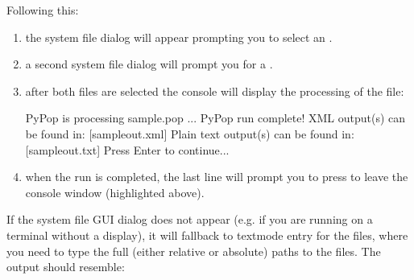 \documentclass[letterpaper,10pt,english,openany,oneside]{sphinxmanual}
\begin{document}
\sphinxAtStartPar
Following this:
\begin{enumerate}
%
\item {} 
\sphinxAtStartPar
the system file dialog will appear prompting you to select an
 {\hyperref[\detokenize{docs/guide-chapter-usage:guide-usage-configfile}]{}}.

\item {} 
\sphinxAtStartPar
a second system file dialog will prompt you for a 
{\hyperref[\detokenize{docs/guide-chapter-usage:guide-usage-datafile}]{}}.

\item {} 
\sphinxAtStartPar
after both files are selected the console will display the
processing of the file:

%
\begin{sphinxVerbatim}[commandchars=\\\{\}]
PyPop is processing sample.pop ...
PyPop run complete!
XML output(s) can be found in: [\PYGZsq{}sample\PYGZhy{}out.xml\PYGZsq{}]
Plain text output(s) can be found in: [\PYGZsq{}sample\PYGZhy{}out.txt\PYGZsq{}]
Press Enter to continue...
\end{sphinxVerbatim}
\sphinxresetverbatimhllines

\item {} 
\sphinxAtStartPar
when the run is completed, the last line will prompt you to press
 to leave the console window (highlighted above).

\end{enumerate}

\sphinxAtStartPar
If the system file GUI dialog does not appear (e.g. if you are running
on a terminal without a display), it will fall\sphinxhyphen{}back to text\sphinxhyphen{}mode entry
for the files, where you need to type the full (either relative or
absolute) paths to the files. The output should resemble:
\end{document}
